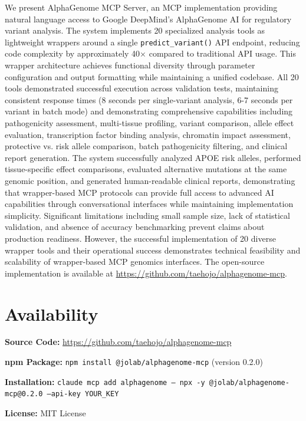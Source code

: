 \documentclass[11pt]{article}
\begin{document}
We present AlphaGenome MCP Server, an MCP implementation providing natural language access to Google DeepMind's AlphaGenome AI for regulatory variant analysis. The system implements 20 specialized analysis tools as lightweight wrappers around a single \texttt{predict\_variant()} API endpoint, reducing code complexity by approximately 40$\times$ compared to traditional API usage. This wrapper architecture achieves functional diversity through parameter configuration and output formatting while maintaining a unified codebase. All 20 tools demonstrated successful execution across validation tests, maintaining consistent response times (8 seconds per single-variant analysis, 6-7 seconds per variant in batch mode) and demonstrating comprehensive capabilities including pathogenicity assessment, multi-tissue profiling, variant comparison, allele effect evaluation, transcription factor binding analysis, chromatin impact assessment, protective vs. risk allele comparison, batch pathogenicity filtering, and clinical report generation. The system successfully analyzed APOE risk alleles, performed tissue-specific effect comparisons, evaluated alternative mutations at the same genomic position, and generated human-readable clinical reports, demonstrating that wrapper-based MCP protocols can provide full access to advanced AI capabilities through conversational interfaces while maintaining implementation simplicity. Significant limitations including small sample size, lack of statistical validation, and absence of accuracy benchmarking prevent claims about production readiness. However, the successful implementation of 20 diverse wrapper tools and their operational success demonstrates technical feasibility and scalability of wrapper-based MCP genomics interfaces. The open-source implementation is available at \url{https://github.com/taehojo/alphagenome-mcp}.

\section*{Availability}

\textbf{Source Code:} \url{https://github.com/taehojo/alphagenome-mcp}

\textbf{npm Package:} \texttt{npm install @jolab/alphagenome-mcp} (version 0.2.0)

\textbf{Installation:} \texttt{claude mcp add alphagenome -- npx -y @jolab/alphagenome-mcp@0.2.0 --api-key YOUR\_KEY}

\textbf{License:} MIT License
\end{document}
